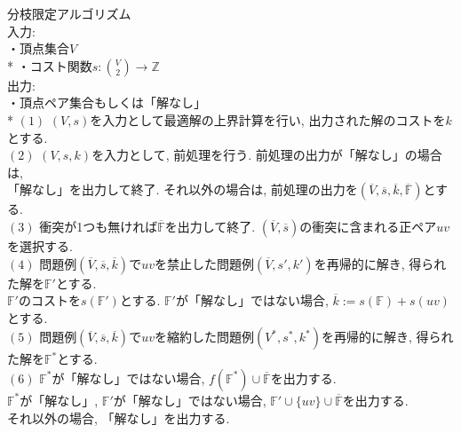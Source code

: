 \documentclass[10.5,a4paper,titlepage, dvipdfmx]{bxjsarticle}
\begin{document}
\begin{screen}
    $\textbf{分枝限定アルゴリズム}$ \\
    入力: \\
    \hspace{15pt} ・頂点集合$V$\\*
    \hspace{15pt} ・コスト関数$s:\binom{V}{2} \rightarrow \mathbb{Z}$\\
    出力: \\
    \hspace{15pt} ・頂点ペア集合もしくは「解なし」\\*
    $(1)$ $(V,s)$を入力として最適解の上界計算を行い, 出力された解のコストを$k$とする.\\
    $(2)$ $(V,s,k)$を入力として, 前処理を行う. 前処理の出力が「解なし」の場合は,\\
    \hspace{15pt}「解なし」を出力して終了. それ以外の場合は, 前処理の出力を$(\overline{V}, \overline{s}, \overline{k}, \overline{\mathbb{F}})$とする.\\
    $(3)$ 衝突が1つも無ければ$\overline{\mathbb{F}}$を出力して終了. $(\overline{V},\overline{s})$の衝突に含まれる正ペア$uv$を選択する.\\
    $(4)$ 問題例$(\overline{V}, \overline{s}, \overline{k})$で$uv$を禁止した問題例$(\overline{V},s',k')$を再帰的に解き, 得られた解を$\mathbb{F'}$とする.\\
    \hspace{15pt} $\mathbb{F'}$のコストを$s(\mathbb{F'})$とする. $\mathbb{F'}$が「解なし」ではない場合, $\overline{k}:=s(\mathbb{F})+s(uv)$とする.\\
    $(5)$ 問題例$(\overline{V}, \overline{s}, \overline{k})$で$uv$を縮約した問題例$(V^*,s^*,k^*)$を再帰的に解き, 得られた解を$\mathbb{F^*}$とする.\\
    $(6)$ $\mathbb{F^*}$が「解なし」ではない場合, $f(\mathbb{F^*}) \cup \overline{\mathbb{F}}$を出力する.\\
    \hspace{15pt}$\mathbb{F^*}$が「解なし」, $\mathbb{F'}$が「解なし」ではない場合, $\mathbb{F'}\cup \{uv\} \cup \overline{\mathbb{F}}$を出力する.\\
    \hspace{15pt}それ以外の場合, 「解なし」を出力する.
\end{screen}
\end{document}
